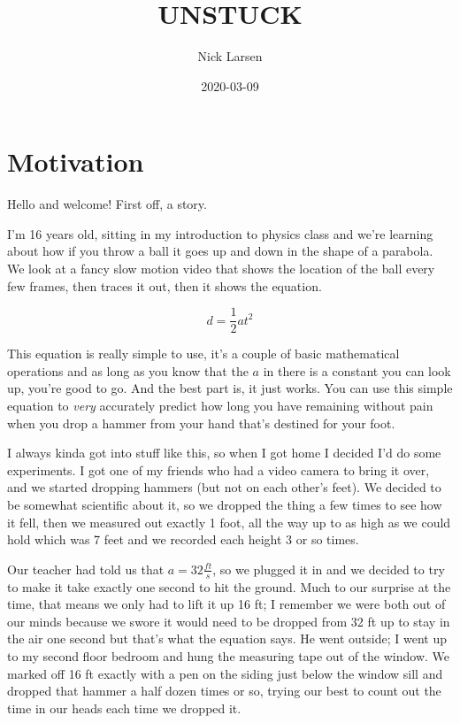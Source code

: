 \documentclass[]{book}
\title{UNSTUCK}
\author{Nick Larsen}
\date{2020-03-09}
\begin{document}
\maketitle

{
\setcounter{tocdepth}{1}
\tableofcontents
}
\hypertarget{motivation}{%
\chapter*{Motivation}\label{motivation}}

Hello and welcome! First off, a story.

I'm 16 years old, sitting in my introduction to physics class and we're learning about how if you throw a ball it goes up and down in the shape of a parabola. We look at a fancy slow motion video that shows the location of the ball every few frames, then traces it out, then it shows the equation.

\[d = \frac{1}{2}at^2\]

This equation is really simple to use, it's a couple of basic mathematical operations and as long as you know that the \(a\) in there is a constant you can look up, you're good to go. And the best part is, it just works. You can use this simple equation to \emph{very} accurately predict how long you have remaining without pain when you drop a hammer from your hand that's destined for your foot.

I always kinda got into stuff like this, so when I got home I decided I'd do some experiments. I got one of my friends who had a video camera to bring it over, and we started dropping hammers (but not on each other's feet). We decided to be somewhat scientific about it, so we dropped the thing a few times to see how it fell, then we measured out exactly 1 foot, all the way up to as high as we could hold which was 7 feet and we recorded each height 3 or so times.

Our teacher had told us that \(a = 32\frac{ft}{s}\), so we plugged it in and we decided to try to make it take exactly one second to hit the ground. Much to our surprise at the time, that means we only had to lift it up 16 ft; I remember we were both out of our minds because we swore it would need to be dropped from 32 ft up to stay in the air one second but that's what the equation says. He went outside; I went up to my second floor bedroom and hung the measuring tape out of the window. We marked off 16 ft exactly with a pen on the siding just below the window sill and dropped that hammer a half dozen times or so, trying our best to count out the time in our heads each time we dropped it.
\end{document}
